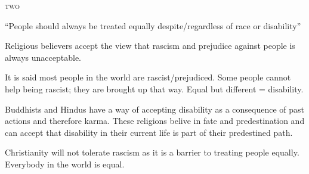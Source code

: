 \documentclass{article}
\begin{document}
\textsc{two}

``People should always be treated equally despite/regardless of race or disability''

Religious believers accept the view that rascism and prejudice against people is always unacceptable.

It is said most people in the world are rascist/prejudiced.  Some people cannot help being rascist; they are brought up that way.  Equal but different = disability.

Buddhists and Hindus have a way of accepting disability as a consequence of past actions and therefore karma.  These religions belive in fate and predestination and can accept that disability in their current life is part of their predestined path.

Christianity will not tolerate rascism as it is a barrier to treating people equally.  Everybody in the world is equal.
\end{document}

